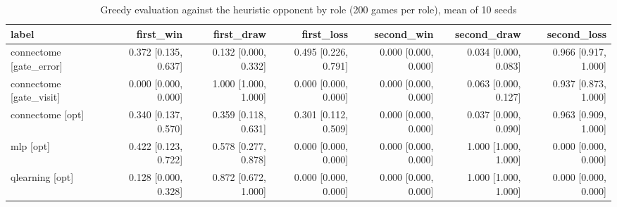 \begin{table}[t]
\centering
\small
\begin{tabular}{lrrrrrr}
\toprule
label & first\_win & first\_draw & first\_loss & second\_win & second\_draw & second\_loss \\
\midrule
connectome [gate\_error] & 0.372 [0.135, 0.637] & 0.132 [0.000, 0.332] & 0.495 [0.226, 0.791] & 0.000 [0.000, 0.000] & 0.034 [0.000, 0.083] & 0.966 [0.917, 1.000] \\
connectome [gate\_visit] & 0.000 [0.000, 0.000] & 1.000 [1.000, 1.000] & 0.000 [0.000, 0.000] & 0.000 [0.000, 0.000] & 0.063 [0.000, 0.127] & 0.937 [0.873, 1.000] \\
connectome [opt] & 0.340 [0.137, 0.570] & 0.359 [0.118, 0.631] & 0.301 [0.112, 0.509] & 0.000 [0.000, 0.000] & 0.037 [0.000, 0.090] & 0.963 [0.909, 1.000] \\
mlp [opt] & 0.422 [0.123, 0.722] & 0.578 [0.277, 0.878] & 0.000 [0.000, 0.000] & 0.000 [0.000, 0.000] & 1.000 [1.000, 1.000] & 0.000 [0.000, 0.000] \\
qlearning [opt] & 0.128 [0.000, 0.328] & 0.872 [0.672, 1.000] & 0.000 [0.000, 0.000] & 0.000 [0.000, 0.000] & 1.000 [1.000, 1.000] & 0.000 [0.000, 0.000] \\
\bottomrule
\end{tabular}
\caption{Greedy evaluation against the heuristic opponent by role (200 games per role), mean of 10 seeds}
\label{tab:tictactoe_roles}
\end{table}